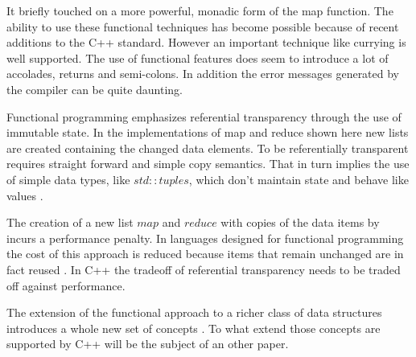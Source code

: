 \documentclass[12pt,fleqn]{article}
\begin{document}
It briefly touched on a more powerful, monadic form of the map function.
The ability to use these functional techniques has become possible because of recent additions to the C++ standard.
However an important technique like currying is well supported.
The use of functional features does seem to introduce a lot of accolades, returns and semi-colons.
In addition the error messages generated by the compiler can be quite daunting.

Functional programming emphasizes referential transparency through the use of immutable state.
In the implementations of map and reduce shown here new lists are created containing the changed data elements.
To be referentially transparent requires straight forward and simple copy semantics.
That in turn implies the use of simple data types, like $std::tuples$, which don't maintain state and behave like values \cite{tuples}.

The creation of a new list  $map$ and $reduce$ with copies of the data items by incurs a performance penalty.
In languages designed for functional programming the cost of this approach is reduced because items that remain unchanged are in fact reused \cite{field}. 
In C++ the tradeoff of referential transparency needs to be traded off against performance.

The extension of the functional approach to a richer class of data structures introduces a whole new set of concepts \cite{bird,lipovaca,yorgey}.
To what extend those concepts are supported by C++ will be the subject of an other paper.
\end{document}
